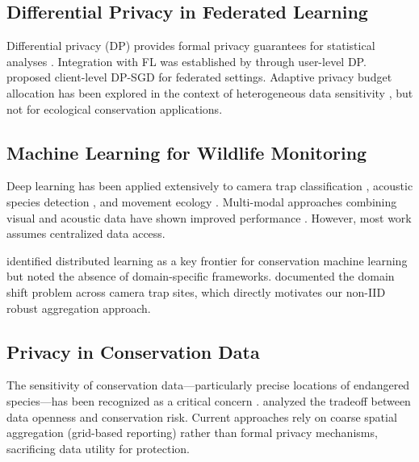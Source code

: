 \documentclass[11pt,a4paper]{article}
\begin{document}
\subsection{Differential Privacy in Federated Learning}

Differential privacy (DP) provides formal privacy guarantees for statistical analyses \citep{dwork2014algorithmic}.
Integration with FL was established by \citet{mcmahan2018learning} through user-level DP.
\citet{geyer2017differentially} proposed client-level DP-SGD for federated settings.
Adaptive privacy budget allocation has been explored in the context of heterogeneous data sensitivity \citep{kang2020incentive}, but not for ecological conservation applications.

\subsection{Machine Learning for Wildlife Monitoring}

Deep learning has been applied extensively to camera trap classification \citep{norouzzadeh2018automatically, beery2019efficient}, acoustic species detection \citep{kahl2021birdnet, stowell2019automatic}, and movement ecology \citep{patterson2017statistical}.
Multi-modal approaches combining visual and acoustic data have shown improved performance \citep{verma2022towards}.
However, most work assumes centralized data access.

\citet{tuia2022perspectives} identified distributed learning as a key frontier for conservation machine learning but noted the absence of domain-specific frameworks.
\citet{beery2021iwildcam} documented the domain shift problem across camera trap sites, which directly motivates our non-IID robust aggregation approach.

\subsection{Privacy in Conservation Data}

The sensitivity of conservation data---particularly precise locations of endangered species---has been recognized as a critical concern \citep{lindenmayer2017do}.
\citet{tulloch2018decision} analyzed the tradeoff between data openness and conservation risk.
Current approaches rely on coarse spatial aggregation (grid-based reporting) rather than formal privacy mechanisms, sacrificing data utility for protection.

\end{document}
